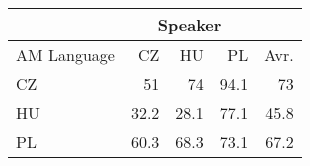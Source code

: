 \begin{tabular}{l|rrr|r}
\hline
 & \multicolumn{3}{c}{Speaker} & \\
\hline
 AM Language   &   CZ &   HU &   PL &   Avr. \\
\hline
 CZ            & 51   & 74   & 94.1 &   73   \\
 HU            & 32.2 & 28.1 & 77.1 &   45.8 \\
 PL            & 60.3 & 68.3 & 73.1 &   67.2 \\
\hline
\end{tabular}